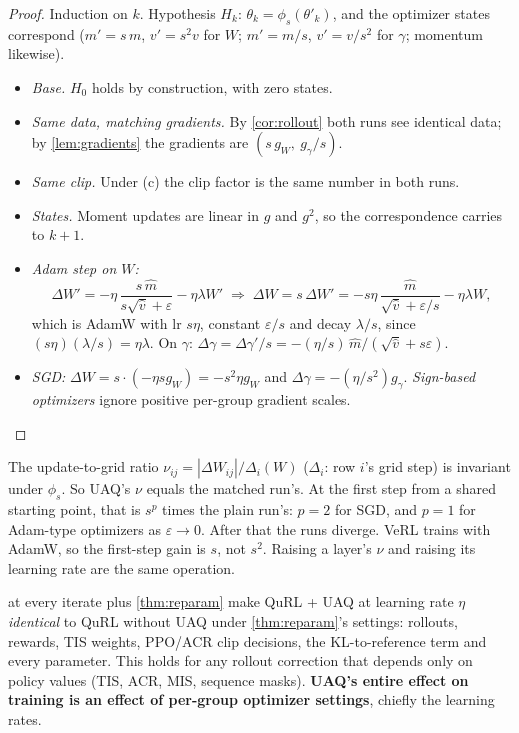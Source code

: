 \documentclass[11pt]{article}
\begin{document}
\begin{proof}
Induction on $k$. Hypothesis $H_k$: $\theta_k=\phi_s(\theta'_k)$, and the optimizer states correspond ($m'=s\,m$, $v'=s^2v$ for $W$; $m'=m/s$, $v'=v/s^2$ for $\gamma$; momentum likewise).
\begin{itemize}
\item \emph{Base.} $H_0$ holds by construction, with zero states.
\item \emph{Same data, matching gradients.} By \cref{cor:rollout} both runs see identical data; by \cref{lem:gradients} the gradients are $(s\,g_W,\ g_\gamma/s)$.
\item \emph{Same clip.} Under (c) the clip factor is the same number in both runs.
\item \emph{States.} Moment updates are linear in $g$ and $g^2$, so the correspondence carries to $k+1$.
\item \emph{Adam step on $W$:}
\[
\Delta W'=-\eta\,\frac{s\,\hat m}{s\sqrt{\hat v}+\varepsilon}-\eta\lambda W' \;\Longrightarrow\; \Delta W=s\,\Delta W'=-s\eta\,\frac{\hat m}{\sqrt{\hat v}+\varepsilon/s}-\eta\lambda W,
\]
which is AdamW with lr $s\eta$, constant $\varepsilon/s$ and decay $\lambda/s$, since $(s\eta)(\lambda/s)=\eta\lambda$. On $\gamma$: $\Delta\gamma=\Delta\gamma'/s=-(\eta/s)\,\hat m/(\sqrt{\hat v}+s\varepsilon)$.
\item \emph{SGD:} $\Delta W=s\cdot(-\eta s g_W)=-s^2\eta g_W$ and $\Delta\gamma=-(\eta/s^2)g_\gamma$. \emph{Sign-based optimizers} ignore positive per-group gradient scales.\qedhere
\end{itemize}
\end{proof}

\begin{corollary}\label{cor:ratio}
The update-to-grid ratio $\nu_{ij}=|\Delta W_{ij}|/\Delta_i(W)$ ($\Delta_i$: row $i$'s grid step) is invariant under $\phi_s$. So UAQ's $\nu$ equals the matched run's. At the first step from a shared starting point, that is $s^p$ times the plain run's: $p=2$ for SGD, and $p=1$ for Adam-type optimizers as $\varepsilon\to0$. After that the runs diverge. VeRL trains with AdamW, so the first-step gain is $s$, not $s^2$. Raising a layer's $\nu$ and raising its learning rate are the same operation.
\end{corollary}

\begin{corollary}\label{cor:pipeline}
 at every iterate plus \cref{thm:reparam} make QuRL + UAQ at learning rate $\eta$ \emph{identical} to QuRL without UAQ under \cref{thm:reparam}'s settings: rollouts, rewards, TIS weights, PPO/ACR clip decisions, the KL-to-reference term and every parameter. This holds for any rollout correction that depends only on policy values (TIS, ACR, MIS, sequence masks). \textbf{UAQ's entire effect on training is an effect of per-group optimizer settings}, chiefly the learning rates.
\end{corollary}
\end{document}
